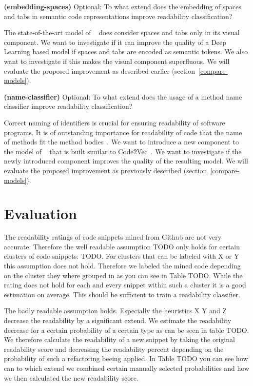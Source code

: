 \documentclass[%
class=scrreprt,
chapterprefix=false,%
open=right,%
twoside=false,%
paper=a4,%
logofile={Logo\_zentral\_farbig\_EN.png},%
thesistype=master,%
UKenglish,%
]{se2thesis}
\begin{document}
	\begin{resq} \textbf{(embedding-spaces)} Optional: To what extend does the embedding of spaces and tabs in semantic code representations improve readability classification?\end{resq} \label{embedding-spaces}
	The state-of-the-art model of \citeauthor{mi2022towards}~\cite{mi2022towards} does consider spaces and tabs only in its visual component. We want to investigate if it can improve the quality of a Deep Learning based model if spaces and tabs are encoded as semantic tokens. We also want to investigate if this makes the visual component superfluous. We will evaluate the proposed improvement as described earlier (section~\ref{compare-models}).
	
	\begin{resq} \textbf{(name-classifier)} Optional: To what extend does the usage of a method name classifier improve readability classification?\end{resq} \label{name-classifier}
	Correct naming of identifiers is crucial for ensuring readability of software programs. It is of outstanding importance for readability of code that the name of methods fit the method bodies~\cite{liu2019learning}. We want to introduce a new component to the model of \citeauthor{mi2022towards}~\cite{mi2022towards} that is built similar to Code2Vec~\cite{alon2019code2vec}. We want to investigate if the newly introduced component improves the quality of the resulting model. We will evaluate the proposed improvement as previously described (section~\ref{compare-models}).
	
	\section{Evaluation} \label{Evaluation}
	The readability ratings of code snippets mined from Github are not very accurate. Therefore the well readable assumption TODO only holds for certain clusters of code snippets: TODO. For clusters that can be labeled with X or Y this assumption does not hold. Therefore we labeled the mined code depending on the cluster they where grouped in as you can see in Table TODO. While the rating does not hold for each and every snippet within such a cluster it is a good estimation on average. This should be sufficient to train a readability classifier.
	
	The badly readable assumption holds. Especially the heuristics X Y and Z decrease the readability by a significant extend. We estimate the readability decrease for a certain probability of a certain type as can be seen in table TODO. We therefore calculate the readability of a new snippet by taking the original readability score and decreasing the readability percent depending on the probability of such a refactoring beeing applied.	In Table TODO you can see how can to which extend we combined certain manually selected probabilities and how we then calculated the new readability score.
	
\end{document}
